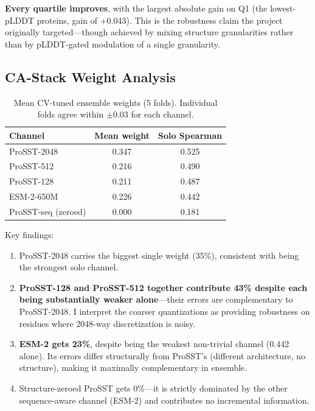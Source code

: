 \documentclass[11pt,a4paper]{article}
\begin{document}
\textbf{Every quartile improves}, with the largest absolute gain on
Q1 (the lowest-pLDDT proteins, gain of +0.043). This is the robustness
claim the project originally targeted---though achieved by mixing
structure granularities rather than by pLDDT-gated modulation of a
single granularity.

\subsection{CA-Stack Weight Analysis}

\begin{table}[h]
\centering
\caption{Mean CV-tuned ensemble weights (5 folds). Individual folds
agree within $\pm 0.03$ for each channel.}
\label{tab:weights}
\begin{tabular}{lcc}
\toprule
Channel & Mean weight & Solo Spearman \\
\midrule
ProSST-2048         & 0.347 & 0.525 \\
ProSST-512          & 0.216 & 0.490 \\
ProSST-128          & 0.211 & 0.487 \\
ESM-2-650M          & 0.226 & 0.442 \\
ProSST-seq (zeroed) & 0.000 & 0.181 \\
\bottomrule
\end{tabular}
\end{table}

Key findings:
\begin{enumerate}[leftmargin=*,itemsep=0pt]
\item ProSST-2048 carries the biggest single weight (35\%), consistent
with being the strongest solo channel.
\item \textbf{ProSST-128 and ProSST-512 together contribute 43\%
despite each being substantially weaker alone}---their errors are
complementary to ProSST-2048. I interpret the coarser quantizations
as providing robustness on residues where 2048-way discretization is
noisy.
\item \textbf{ESM-2 gets 23\%}, despite being the weakest non-trivial
channel (0.442 alone). Its errors differ structurally from ProSST's
(different architecture, no structure), making it maximally
complementary in ensemble.
\item Structure-zeroed ProSST gets 0\%---it is strictly dominated by
the other sequence-aware channel (ESM-2) and contributes no
incremental information.
\end{enumerate}
\end{document}
